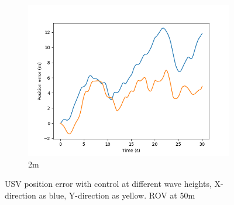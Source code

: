 \documentclass[class=article, crop=false]{standalone}
\begin{document}
\begin{figure}
\begin{subfigure}[b]{0.48\textwidth}
        \includegraphics{scenario1/rov-50m/2.0m/usv_pos_error_controlled}
        \caption{2m}
        \label{}
    \end{subfigure}
    \caption{USV position error with control at different wave heights, X-direction as blue, Y-direction as yellow. ROV at 50m}
    \label{}
\end{figure}
\end{document}
